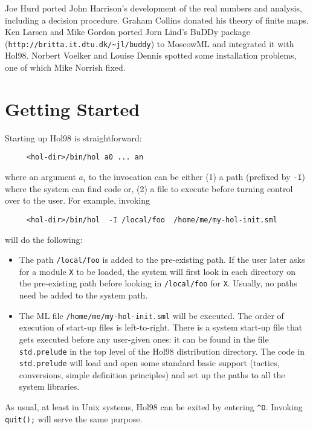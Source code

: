 Joe Hurd ported John Harrison's development of the real numbers and
analysis, including a decision procedure. Graham Collins donated his
theory of finite maps. Ken Larsen and Mike Gordon ported Jorn Lind's
BuDDy package (\verb+http://britta.it.dtu.dk/~jl/buddy+) to MoscowML and
integrated it with Hol98. Norbert Voelker and Louise Dennis spotted some
installation problems, one of which Mike Norrish fixed.


\tableofcontents

\chapter{Getting Started}

 Starting up Hol98 is straightforward:
 \begin{verbatim}
     <hol-dir>/bin/hol a0 ... an
 \end{verbatim}
 where an argument $a_i$ to the invocation can be either (1) a path
 (prefixed by \verb+-I+) where the system can find code or, (2) a file to
 execute before turning control over to the user. For example, invoking 
 \begin{verbatim}
     <hol-dir>/bin/hol  -I /local/foo  /home/me/my-hol-init.sml
 \end{verbatim}
 will do the following:
 \begin{itemize}
 \item The path \verb+/local/foo+ is added to the pre-existing path. If
    the user later asks for a module \verb+X+ to be loaded, the system
    will first look in each directory on the pre-existing path before
    looking in \verb+/local/foo+ for \verb+X+. Usually, no paths need be
    added to the system path.

 \item The ML file \verb+/home/me/my-hol-init.sml+ will be executed. The
      order of execution of start-up files is left-to-right. There is a
      system start-up file that gets executed before any user-given ones:
      it can be found in the file \verb+std.prelude+ in the top level of the
      Hol98 distribution directory. The code in \verb+std.prelude+ will
      load and open some standard basic support (tactics, conversions,
      simple definition principles) and set up the paths to all the
      system libraries. 
 \end{itemize}

 As usual, at least in Unix systems, Hol98 can be exited by entering
 \verb+^D+. Invoking \verb+quit();+ will serve the same purpose.

